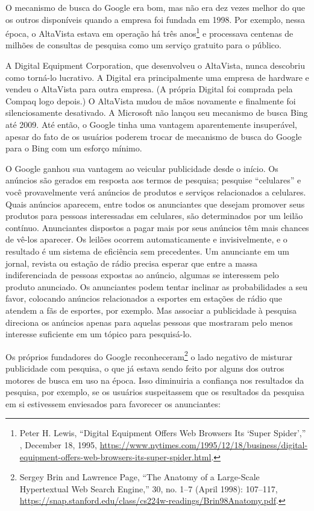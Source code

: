O mecanismo de busca do Google era bom, mas não era dez vezes melhor do que os outros disponíveis
quando a empresa foi fundada em 1998. Por exemplo, nessa época, o AltaVista estava em operação há
três anos\footnote{Peter H. Lewis, ``Digital Equipment Offers Web Browsers Its `Super Spider',''
, December 18, 1995,
\url{https://www.nytimes.com/1995/12/18/business/digital-equipment-offers-web-browsers-its-super-spider.html}.}
e processava centenas de milhões de consultas de pesquisa como um serviço gratuito para o público.

A Digital Equipment Corporation, que desenvolveu o AltaVista, nunca descobriu como torná-lo
lucrativo. A Digital era principalmente uma empresa de hardware e vendeu o AltaVista para outra
empresa. (A própria Digital foi comprada pela Compaq logo depois.) O AltaVista mudou de mãos
novamente e finalmente foi silenciosamente desativado. A Microsoft não lançou seu mecanismo de
busca Bing até 2009. Até então, o Google tinha uma vantagem aparentemente insuperável, apesar do
fato de os usuários poderem trocar de mecanismo de busca do Google para o Bing com um esforço
mínimo.

O Google ganhou sua vantagem ao veicular publicidade desde o início. Os anúncios são gerados em
resposta aos termos de pesquisa; pesquise ``celulares'' e você provavelmente verá anúncios de
produtos e serviços relacionados a celulares. Quais anúncios aparecem, entre todos os anunciantes
que desejam promover seus produtos para pessoas interessadas em celulares, são determinados por
um leilão contínuo. Anunciantes dispostos a pagar mais por seus anúncios têm mais chances de
vê-los aparecer. Os leilões ocorrem automaticamente e invisivelmente, e o resultado é um sistema
de eficiência sem precedentes. Um anunciante em um jornal, revista ou estação de rádio precisa
esperar que entre a massa indiferenciada de pessoas expostas ao anúncio, algumas se interessem
pelo produto anunciado. Os anunciantes podem tentar inclinar as probabilidades a seu favor,
colocando anúncios relacionados a esportes em estações de rádio que atendem a fãs de esportes,
por exemplo. Mas associar a publicidade à pesquisa direciona os anúncios apenas para aquelas
pessoas que mostraram pelo menos interesse suficiente em um tópico para pesquisá-lo.

Os próprios fundadores do Google reconheceram\footnote{Sergey Brin and Lawrence Page, ``The
Anatomy of a Large-Scale Hypertextual Web Search Engine,''  30, no. 1–7 (April 1998): 107–117,
\url{https://snap.stanford.edu/class/cs224w-readings/Brin98Anatomy.pdf}.} o lado negativo de
misturar publicidade com pesquisa, o que já estava sendo feito por alguns dos outros motores
de busca em uso na época. Isso diminuiria a confiança nos resultados da pesquisa, por exemplo,
se os usuários suspeitassem que os resultados da pesquisa em si estivessem enviesados para
favorecer os anunciantes:

